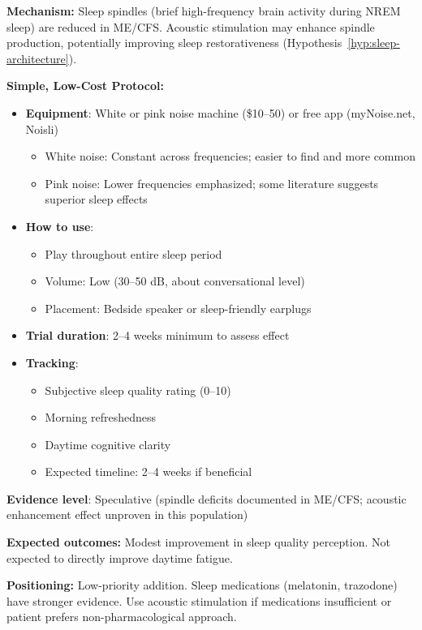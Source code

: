 \begin{recommendation}
\label{rec:sleep-spindle-mild-moderate}

\textbf{Mechanism:} Sleep spindles (brief high-frequency brain activity during NREM sleep) are reduced in ME/CFS. Acoustic stimulation may enhance spindle production, potentially improving sleep restorativeness (Hypothesis~\ref{hyp:sleep-architecture}).

\textbf{Simple, Low-Cost Protocol:}

\begin{itemize}
    \item \textbf{Equipment}: White or pink noise machine (\$10--50) or free app (myNoise.net, Noisli)
    \begin{itemize}
        \item White noise: Constant across frequencies; easier to find and more common
        \item Pink noise: Lower frequencies emphasized; some literature suggests superior sleep effects
    \end{itemize}

    \item \textbf{How to use}:
    \begin{itemize}
        \item Play throughout entire sleep period
        \item Volume: Low (30--50 dB, about conversational level)
        \item Placement: Bedside speaker or sleep-friendly earplugs
    \end{itemize}

    \item \textbf{Trial duration}: 2--4 weeks minimum to assess effect

    \item \textbf{Tracking}:
    \begin{itemize}
        \item Subjective sleep quality rating (0--10)
        \item Morning refreshedness
        \item Daytime cognitive clarity
        \item Expected timeline: 2--4 weeks if beneficial
    \end{itemize}
\end{itemize}

\textbf{Evidence level}: Speculative (spindle deficits documented in ME/CFS; acoustic enhancement effect unproven in this population)

\textbf{Expected outcomes:} Modest improvement in sleep quality perception. Not expected to directly improve daytime fatigue.

\textbf{Positioning:} Low-priority addition. Sleep medications (melatonin, trazodone) have stronger evidence. Use acoustic stimulation if medications insufficient or patient prefers non-pharmacological approach.

\end{recommendation}

